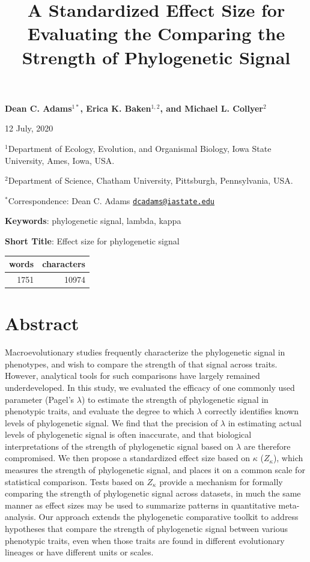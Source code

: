 \documentclass[]{article}
\title{A Standardized Effect Size for Evaluating the Comparing the Strength of
Phylogenetic Signal}
\author{}
\date{\vspace{-2.5em}}
\begin{document}
\maketitle

\begin{center}
\textbf{Dean C. Adams$^{1 *}$, Erica K. Baken$^{1,2}$,  and Michael L. Collyer$^{2}$}
\end{center}

\begin{center}12 July, 2020\end{center}

\(^{1}\)Department of Ecology, Evolution, and Organismal Biology, Iowa
State University, Ames, Iowa, USA.

\(^{2}\)Department of Science, Chatham University, Pittsburgh,
Pennsylvania, USA.

\(^{*}\)Correspondence: Dean C. Adams
\href{mailto:dcadams@iastate.edu}{\nolinkurl{dcadams@iastate.edu}}
\hfill\break

\textbf{Keywords}: phylogenetic signal, lambda, kappa \hfill\break

\textbf{Short Title}: Effect size for phylogenetic signal \hfill\break

\begin{longtable}[]{@{}rr@{}}
\toprule
words & characters\tabularnewline
\midrule
\endhead
1751 & 10974\tabularnewline
\bottomrule
\end{longtable}

\newpage

\hypertarget{abstract}{%
\section{Abstract}\label{abstract}}

Macroevolutionary studies frequently characterize the phylogenetic
signal in phenotypes, and wish to compare the strength of that signal
across traits. However, analytical tools for such comparisons have
largely remained underdeveloped. In this study, we evaluated the
efficacy of one commonly used parameter (Pagel's \(\lambda\)) to
estimate the strength of phylogenetic signal in phenotypic traits, and
evaluate the degree to which \(\lambda\) correctly identifies known
levels of phylogenetic signal. We find that the precision of \(\lambda\)
in estimating actual levels of phylogenetic signal is often inaccurate,
and that biological interpretations of the strength of phylogenetic
signal based on \(\lambda\) are therefore compromised. We then propose a
standardized effect size based on \(\kappa\) (\(Z_\kappa\)), which
measures the strength of phylogenetic signal, and places it on a common
scale for statistical comparison. Tests based on \(Z_\kappa\) provide a
mechanism for formally comparing the strength of phylogenetic signal
across datasets, in much the same manner as effect sizes may be used to
summarize patterns in quantitative meta-analysis. Our approach extends
the phylogenetic comparative toolkit to address hypotheses that compare
the strength of phylogenetic signal between various phenotypic traits,
even when those traits are found in different evolutionary lineages or
have different units or scales.
\end{document}
